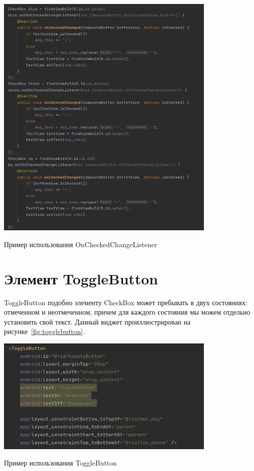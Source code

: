 \begin{image}
	\includegraphics[width=0.8\textwidth]{Screenshot from 2023-03-25 17-51-18.png}
	\caption{Пример использования OnCheckedChangeListener}
	\label{fig:checkedchangelistener}
\end{image}

\section{Элемент ToggleButton}
ToggleButton подобно элементу CheckBox может пребывать в двух 
состояниях: отмеченном и неотмеченном, причем для каждого состояния мы 
можем отдельно установить свой текст.
Данный виджет проиллюстрирован на рисунке~\ref{fig:togglebutton}.

\begin{image}
	\includegraphics[width=0.8\textwidth]{Screenshot from 2023-03-25 17-55-50.png}
	\caption{Пример использования ToggleButton}
	\label{fig:togglebutton}
\end{image}

